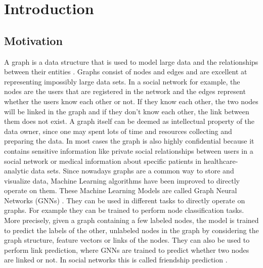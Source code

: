 \chapter{Introduction}


	\section{Motivation}

		A graph is a data structure that is used to model large data and the relationships between their entities \cite{DBLP:journals/corr/abs-2005-00687, cook2006mining}.
		Graphs consist of nodes and edges and are excellent at representing impossibly large data sets.
		In a social network for example, the nodes are the users that are registered in the network and the edges represent whether the users know each other or not.
		If they know each other, the two nodes will be linked in the graph and if they don't know each other, the link between them does not exist.
		A graph itself can be deemed as intellectual property of the data owner, since one may spent lots of time and resources collecting and preparing the data.
		In most cases the graph is also highly confidential because it contains sensitive information like private social relationships between users in a social network or medical information about specific patients in healthcare-analytic data sets.
		Since nowadays graphs are a common way to store and visualize data, Machine Learning algorithms have been improved to directly operate on them.
		These Machine Learning Models are called Graph Neural Networks (GNNs) \cite{atwood2016diffusionconvolutional, defferrard2017convolutional}.
		They can be used in different tasks to directly operate on graphs.
		For example they can be trained to perform node classification tasks\cite{kipf2017semisupervised}.
		More precisely, given a graph containing a few labeled nodes, the model is trained to predict the labels of the other, unlabeled nodes in the graph by considering the graph structure, feature vectors or links of the nodes.
		They can also be used to perform link prediction, where GNNs are trained to predict whether two nodes are linked or not.
		In social networks this is called friendship prediction \cite{zhang2018link}.


